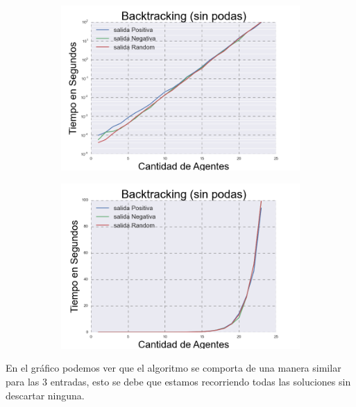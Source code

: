 \begin{figure}[h]
\begin{subfigure}{0.5\textwidth}
\includegraphics[scale=0.45]{BacktrackingLog.png}
\end{subfigure}
\begin{subfigure}{0.5\textwidth}
\includegraphics[scale=0.45]{Backtracking.png}
\end{subfigure}
\end{figure}

	En el gráfico podemos ver que el algoritmo se comporta de una manera similar para las 3 entradas, esto se debe que estamos recorriendo todas las soluciones sin descartar ninguna.

	


